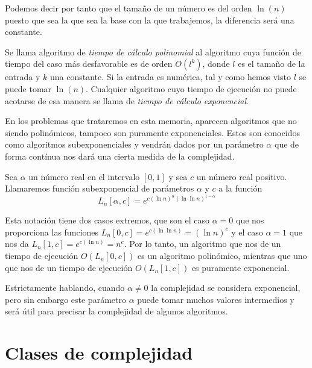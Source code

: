 Podemos decir por tanto que el tama\~no de un n\'umero es del orden $\ln(n)$ puesto que sea la que sea la base con la que trabajemos, la diferencia ser\'a una constante.

\begin{definition}
Se llama algoritmo de \textit{tiempo de cálculo polinomial} al algoritmo cuya función de tiempo del caso más desfavorable es de orden
$O(l^k)$, donde $l$ es el tamaño de la entrada y $k$ una constante. Si la entrada es num\'erica, tal y como hemos visto $l$ se puede tomar $\ln(n)$.
Cualquier algoritmo cuyo tiempo de ejecución no puede acotarse de esa manera se llama de \textit{tiempo de cálculo exponencial}.
\end{definition}

En los problemas que trataremos en esta memoria, aparecen algoritmos que no siendo polin\'omicos, tampoco son puramente exponenciales.
Estos son conocidos como algoritmos subexponenciales y vendr\'an dados por un par\'ametro $\alpha$ que de forma cont\'inua nos dar\'a una cierta
medida de la complejidad.

\begin{definition}
Sea $\alpha$ un n\'umero real en el intervalo $[0,1]$ y sea $c$ un n\'umero real positivo. Llamaremos funci\'on subexponencial de par\'ametros
$\alpha$ y $c$ a la funci\'on
\[ L_n[\alpha,c] = e^{c(\ln n)^\alpha (\ln \ln n)^{1-\alpha}} \]
\end{definition}

Esta notaci\'on tiene dos casos extremos, que son el caso $\alpha = 0$ que nos proporciona las funciones $L_n[0,c] = e^{c(\ln\ln n)} =(\ln n)^c$ y el
caso $\alpha = 1$ que nos da $L_n[1,c] = e^{c(\ln n)} = n^c$. Por lo tanto, un algoritmo que nos de un tiempo de ejecuci\'on $O(L_n[0,c])$ es un
algoritmo polin\'omico, mientras que uno que nos de un tiempo de ejecuci\'on $O(L_n[1,c])$ es puramente exponencial.

Estrictamente hablando, cuando $\alpha \not= 0$ la complejidad se considera exponencial, pero
sin embargo este par\'ametro $\alpha$ puede tomar muchos valores intermedios y ser\'a \'util para precisar la complejidad
de algunos algoritmos.

\section{Clases de complejidad}

